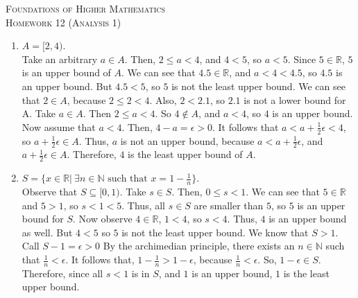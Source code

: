 \documentclass{article}
\theoremstyle{problem}
\theoremstyle{plain}
\theoremstyle{remark}
\begin{document}
\begin{center}
  \textsc{\Large Foundations of Higher Mathematics}\\[.3cm]
  \textsc{\Large Homework 12 (Analysis 1)}
\end{center}

\begin{enumerate}
\item $A = [2,4)$.\\
  Take an arbitrary $a \in A$.
  Then, $2 \leq a < 4$, and $4 < 5$, so $a < 5$.
  Since $5 \in \mathbb{R}$, $5$ is an upper bound of $A$.
  We can see that $4.5 \in \mathbb{R}$, and $a < 4 < 4.5$, so $4.5$ is an upper bound.
  But $4.5 < 5$, so $5$ is not the least upper bound.
  We can see that $2 \in A$, because $2 \leq 2 < 4$.
  Also, $2 < 2.1$, so $2.1$ is not a lower bound for A.
  Take $a \in A$. Then $2 \leq a < 4$. So $4 \not \in A$, and $a < 4$, so $4$ is an upper bound.
  Now assume that $a < 4$.
  Then, $4 - a = \epsilon > 0$.
  It follows that $a < a + \frac{1}{2} \epsilon < 4$, so $a + \frac{1}{2} \epsilon \in A$.  
  Thus, $a$ is not an upper bound, because $a < a + \frac{1}{2} \epsilon$, and $a + \frac{1}{2} \epsilon \in A$.
  Therefore, $4$ is the least upper bound of $A$.

\item $S = \{x \in \mathbb{R}|\ \exists n \in \mathbb{N} \text{ such that } x = 1 - \frac{1}{n}\}$.\\
  Observe that $S \subseteq [0,1)$. %
    Take $s \in S$.
    Then, $0 \leq s < 1$.
    We can see that $5 \in \mathbb{R}$ and $5 > 1$, so $s < 1 < 5$.
    Thus, all $s \in S$ are smaller than $5$, so $5$ is an upper bound for $S$.
    Now observe $4 \in \mathbb{R}$, $1 < 4$, so $s < 4$.
    Thus, $4$ is an upper bound as well.
    But $4 < 5$ so $5$ is not the least upper bound.
    We know that $S > 1$.
    Call $S - 1 = \epsilon > 0$
    By the archimedian principle, there exists an $n \in \mathbb{N}$ such that $\frac{1}{n} < \epsilon$.
    It follows that, $1 - \frac{1}{n} > 1 - \epsilon$, because $\frac{1}{n} < \epsilon$.
    So, $1 - \epsilon \in S$.
    Therefore, since all $s < 1$ is in $S$, and $1$ is an upper bound, $1$ is the least upper bound.
    

\end{enumerate}
\end{document}
